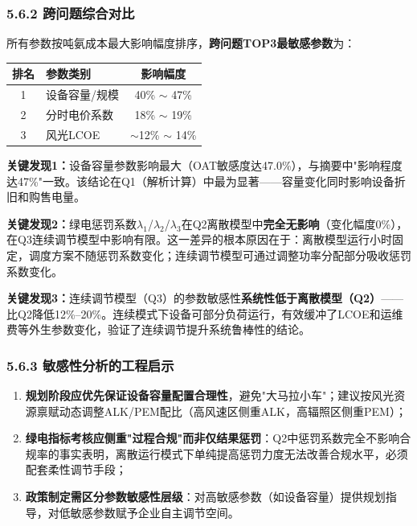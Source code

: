 \documentclass[zihao=-4,a4paper]{ctexart} %
\begin{document}
	\subsubsection*{5.6.2 跨问题综合对比}
	
	所有参数按吨氨成本最大影响幅度排序，\textbf{跨问题TOP3最敏感参数}为：
	
	\begin{center}
		\begin{tabular}{clc}
			\toprule
			排名 & 参数类别 & 影响幅度 \\
			\midrule
			1 & 设备容量/规模 & 40\% $\sim$ 47\% \\
			2 & 分时电价系数 & 18\% $\sim$ 19\% \\
			3 & 风光LCOE & $\sim$12\% $\sim$ 14\% \\
			\bottomrule
		\end{tabular}
	\end{center}
	
	\vspace{0.3em}
	\noindent\textbf{关键发现1：}设备容量参数影响最大（OAT敏感度达47.0\%），与摘要中"影响程度达47\%"一致。该结论在Q1（解析计算）中最为显著——容量变化同时影响设备折旧和购售电量。
	
	\noindent\textbf{关键发现2：}绿电惩罚系数$\lambda_1$/$\lambda_2$/$\lambda_3$在Q2离散模型中\textbf{完全无影响}（变化幅度0\%），在Q3连续调节模型中影响有限。这一差异的根本原因在于：离散模型运行小时固定，调度方案不随惩罚系数变化；连续调节模型可通过调整功率分配部分吸收惩罚系数变化。
	
	\noindent\textbf{关键发现3：}连续调节模型（Q3）的参数敏感性\textbf{系统性低于离散模型（Q2）}——比Q2降低12\%--20\%。连续模式下设备可部分负荷运行，有效缓冲了LCOE和运维费等外生参数变化，验证了连续调节提升系统鲁棒性的结论。
	
	\subsubsection*{5.6.3 敏感性分析的工程启示}
	
	\begin{enumerate}
		\item \textbf{规划阶段应优先保证设备容量配置合理性}，避免"大马拉小车"；建议按风光资源禀赋动态调整ALK/PEM配比（高风速区侧重ALK，高辐照区侧重PEM）；
		\item \textbf{绿电指标考核应侧重"过程合规"而非仅结果惩罚}：Q2中惩罚系数完全不影响合规率的事实表明，离散运行模式下单纯提高惩罚力度无法改善合规水平，必须配套柔性调节手段；
		\item \textbf{政策制定需区分参数敏感性层级}：对高敏感参数（如设备容量）提供规划指导，对低敏感参数赋予企业自主调节空间。
	\end{enumerate}
	
\end{document}
